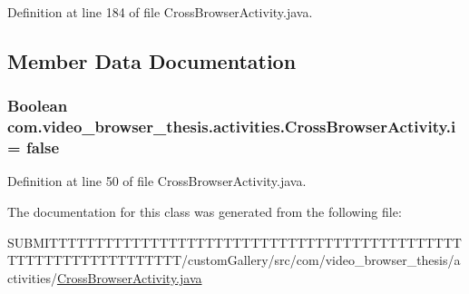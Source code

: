 Definition at line 184 of file Cross\-Browser\-Activity.\-java.



\subsection{Member Data Documentation}
\hypertarget{classcom_1_1video__browser__thesis_1_1activities_1_1_cross_browser_activity_a8b4e9b1b0b2fe461d754ec3f97229ff1}{
\subsubsection[{i}]{\setlength{\rightskip}{0pt plus 5cm}Boolean com.\-video\-\_\-browser\-\_\-thesis.\-activities.\-Cross\-Browser\-Activity.\-i = false\hspace{0.3cm}{\ttfamily [static]}}}\label{classcom_1_1video__browser__thesis_1_1activities_1_1_cross_browser_activity_a8b4e9b1b0b2fe461d754ec3f97229ff1}


Definition at line 50 of file Cross\-Browser\-Activity.\-java.



The documentation for this class was generated from the following file\-:\begin{DoxyCompactItemize}
\item 
S\-U\-B\-M\-I\-T\-T\-T\-T\-T\-T\-T\-T\-T\-T\-T\-T\-T\-T\-T\-T\-T\-T\-T\-T\-T\-T\-T\-T\-T\-T\-T\-T\-T\-T\-T\-T\-T\-T\-T\-T\-T\-T\-T\-T\-T\-T\-T\-T\-T\-T\-T\-T\-T\-T\-T\-T\-T\-T\-T\-T\-T\-T\-T\-T\-T\-T\-T\-T/custom\-Gallery/src/com/video\-\_\-browser\-\_\-thesis/activities/\hyperlink{_cross_browser_activity_8java}{Cross\-Browser\-Activity.\-java}\end{DoxyCompactItemize}
